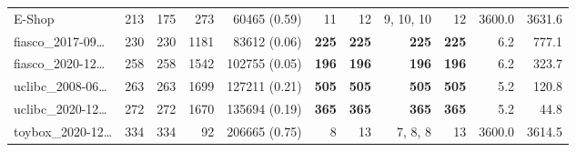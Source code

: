 \begin{table*}
\begin{tiny}
{\begin{tabular}{lrrrrrrrrrr}
E-Shop & \num[text-series-to-math=true]{213} & \num[text-series-to-math=true]{175} & \num[text-series-to-math=true]{273} & \num[text-series-to-math=true]{60465} (\num[text-series-to-math=true]{0.59}) & \num[text-series-to-math=true]{11} & \num[text-series-to-math=true]{12} & \num[text-series-to-math=true]{9}, \num[text-series-to-math=true]{10}, \num[text-series-to-math=true]{10} & \num[text-series-to-math=true]{12} & 3600.0 & 3631.6\\
fiasco\_2017-09\ldots & \num[text-series-to-math=true]{230} & \num[text-series-to-math=true]{230} & \num[text-series-to-math=true]{1181} & \num[text-series-to-math=true]{83612} (\num[text-series-to-math=true]{0.06}) & \textbf{\num[text-series-to-math=true]{225}} & \textbf{\num[text-series-to-math=true]{225}} & \textbf{\num[text-series-to-math=true]{225}} & \textbf{\num[text-series-to-math=true]{225}} & 6.2 & 777.1\\
fiasco\_2020-12\ldots & \num[text-series-to-math=true]{258} & \num[text-series-to-math=true]{258} & \num[text-series-to-math=true]{1542} & \num[text-series-to-math=true]{102755} (\num[text-series-to-math=true]{0.05}) & \textbf{\num[text-series-to-math=true]{196}} & \textbf{\num[text-series-to-math=true]{196}} & \textbf{\num[text-series-to-math=true]{196}} & \textbf{\num[text-series-to-math=true]{196}} & 6.2 & 323.7\\
uclibc\_2008-06\ldots & \num[text-series-to-math=true]{263} & \num[text-series-to-math=true]{263} & \num[text-series-to-math=true]{1699} & \num[text-series-to-math=true]{127211} (\num[text-series-to-math=true]{0.21}) & \textbf{\num[text-series-to-math=true]{505}} & \textbf{\num[text-series-to-math=true]{505}} & \textbf{\num[text-series-to-math=true]{505}} & \textbf{\num[text-series-to-math=true]{505}} & 5.2 & 120.8\\
uclibc\_2020-12\ldots & \num[text-series-to-math=true]{272} & \num[text-series-to-math=true]{272} & \num[text-series-to-math=true]{1670} & \num[text-series-to-math=true]{135694} (\num[text-series-to-math=true]{0.19}) & \textbf{\num[text-series-to-math=true]{365}} & \textbf{\num[text-series-to-math=true]{365}} & \textbf{\num[text-series-to-math=true]{365}} & \textbf{\num[text-series-to-math=true]{365}} & 5.2 & 44.8\\
toybox\_2020-12\ldots & \num[text-series-to-math=true]{334} & \num[text-series-to-math=true]{334} & \num[text-series-to-math=true]{92} & \num[text-series-to-math=true]{206665} (\num[text-series-to-math=true]{0.75}) & \num[text-series-to-math=true]{8} & \num[text-series-to-math=true]{13} & \num[text-series-to-math=true]{7}, \num[text-series-to-math=true]{8}, \num[text-series-to-math=true]{8} & \num[text-series-to-math=true]{13} & 3600.0 & 3614.5\\

\end{tabular}}
\end{tiny}
\end{table*}
